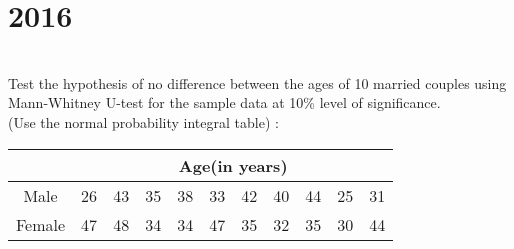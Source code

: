 \section*{2016}
\vspace{-.5cm}
\hrulefill \smallskip\\
 Test the hypothesis of no difference between the ages of 10 married couples using Mann-Whitney U-test for the sample data at 10\% level of significance.\\(Use the normal probability integral table) :
\begin{center}
    \begin{tabular}{|*{11}{c|}}\hline
    &\multicolumn{10}{c|}{Age(in years)} \\ \hline
    Male & 26 & 43 & 35 & 38 & 33 & 42 & 40 & 44 & 25 & 31 \\\hline
    Female & 47 & 48 & 34 & 34 & 47 & 35 & 32 & 35 & 30 & 44 \\ \hline
    \end{tabular}   
\end{center}

